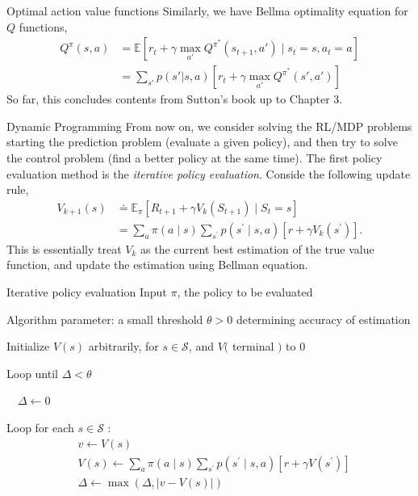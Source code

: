 \documentclass[handout]{beamer}
\begin{document}
\begin{frame}{Optimal action value functions}
    Similarly, we have Bellma optimality equation for $Q$ functions,
    \begin{equation}
    \begin{aligned}
    Q^{\pi}(s,a) &= \mathbb{E} \left[r_t +\gamma \max_{a'} Q^{\pi^*}(s_{t+1},a') \mid s_t = s, a_t = a \right] \\
    &= \sum_{s'} p(s'|s,a)\left[ r_t + \gamma \max_{a'} Q^{\pi^*}(s',a') \right]
    \end{aligned}
    \end{equation}
    So far, this concludes contents from Sutton's book up to Chapter 3.
\end{frame}

\begin{frame}{Dynamic Programming}
    From now on, we consider solving the RL/MDP problems starting the prediction problem (evaluate a given policy), and then try to solve the control problem (find a better policy at the same time).
    The first policy evaluation method is the \textit{iterative policy evaluation}. Conside the following update rule,
    \begin{equation}
    \begin{aligned}
    V_{k+1}(s) & \doteq \mathbb{E}_{\pi}\left[R_{t+1}+\gamma V_{k}\left(S_{t+1}\right) \mid S_{t}=s\right] \\
    &=\sum_{a} \pi(a \mid s) \sum_{s^{\prime}} p\left(s^{\prime} \mid s, a\right)\left[r+\gamma V_{k}\left(s^{\prime}\right)\right].
    \end{aligned}
    \end{equation}
    This is essentially treat $V_k$ as the current best estimation of the true value function, and update the estimation using Bellman equation.
\end{frame}

\begin{frame}{Iterative policy evaluation}
Input $\pi$, the policy to be evaluated

Algorithm parameter: a small threshold $\theta>0$ determining accuracy of estimation 

Initialize $V(s)$ arbitrarily, for $s \in \mathcal{S}$, and $V($ terminal $)$ to 0

Loop until $\Delta<\theta$

$\quad \Delta \leftarrow 0$

\quad Loop for each $s \in \mathcal{S}$ :
\begin{equation*}
\begin{aligned}
&v \leftarrow V(s) \\
&V(s) \leftarrow \sum_{a} \pi(a \mid s) \sum_{s^{\prime}} p\left(s^{\prime} \mid s, a\right)\left[r+\gamma V\left(s^{\prime}\right)\right] \\
&\Delta \leftarrow \max (\Delta,|v-V(s)|)
\end{aligned}
\end{equation*}

\end{frame}
\end{document}

